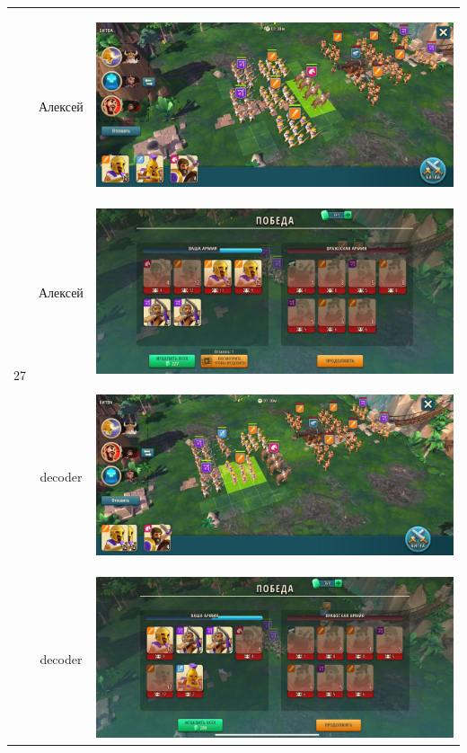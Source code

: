 \begin{longtable}{|c|c|c|}
	\hline
	\multirow{4}{*}{27} & Алексей &
	\hypertarget{fight27}{\includegraphics[width=0.75\linewidth]{./parts/media/TreasureHunt/27/alexey/photo_2022-04-14_12-34-58.jpg}} \\
	& Алексей &
	\includegraphics[width=0.75\linewidth]{./parts/media/TreasureHunt/27/alexey/photo_2022-04-14_12-34-36.jpg} \\
	\hline
	\multirow{4}{*}{27} & decoder &
	\hypertarget{fight27}{\includegraphics[width=0.75\linewidth]{./parts/media/TreasureHunt/27/decoder/photo_2022-04-13_17-26-43.jpg}} \\
	& decoder &
	\includegraphics[width=0.75\linewidth]{./parts/media/TreasureHunt/27/decoder/photo_2022-04-13_17-27-02.jpg} \\

\end{longtable}
